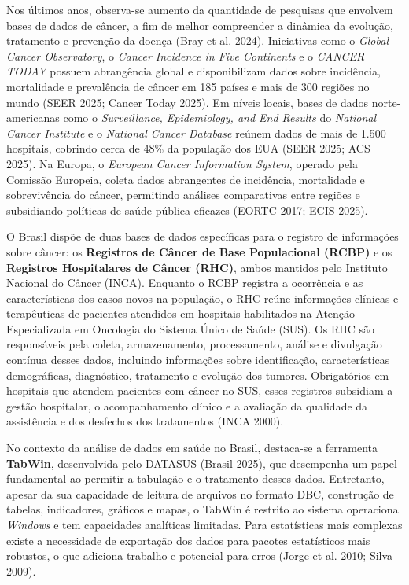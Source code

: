 \documentclass[
  brazilian,
  a4paper,
  oneside]{scrbook}
\begin{document}
Nos últimos anos, observa-se aumento da quantidade de pesquisas que
envolvem bases de dados de câncer, a fim de melhor compreender a
dinâmica da evolução, tratamento e prevenção da doença ({Bray et al.}
2024). Iniciativas como o \emph{Global Cancer Observatory}, o
\emph{Cancer Incidence in Five Continents} e o \emph{CANCER TODAY}
possuem abrangência global e disponibilizam dados sobre incidência,
mortalidade e prevalência de câncer em 185 países e mais de 300 regiões
no mundo (SEER 2025; Cancer Today 2025). Em níveis locais, bases de
dados norte-americanas como o \emph{Surveillance, Epidemiology, and End
Results} do \emph{National Cancer Institute} e o \emph{National Cancer
Database} reúnem dados de mais de 1.500 hospitais, cobrindo cerca de
48\% da população dos EUA (SEER 2025; ACS 2025). Na Europa, o
\emph{European Cancer Information System}, operado pela Comissão
Europeia, coleta dados abrangentes de incidência, mortalidade e
sobrevivência do câncer, permitindo análises comparativas entre regiões
e subsidiando políticas de saúde pública eficazes (EORTC 2017; ECIS
2025).

O Brasil dispõe de duas bases de dados específicas para o registro de
informações sobre câncer: os \textbf{Registros de Câncer de Base
Populacional (RCBP)} e os \textbf{Registros Hospitalares de Câncer
(RHC)}, ambos mantidos pelo Instituto Nacional do Câncer (INCA).
Enquanto o RCBP registra a ocorrência e as características dos casos
novos na população, o RHC reúne informações clínicas e terapêuticas de
pacientes atendidos em hospitais habilitados na Atenção Especializada em
Oncologia do Sistema Único de Saúde (SUS). Os RHC são responsáveis pela
coleta, armazenamento, processamento, análise e divulgação contínua
desses dados, incluindo informações sobre identificação, características
demográficas, diagnóstico, tratamento e evolução dos tumores.
Obrigatórios em hospitais que atendem pacientes com câncer no SUS, esses
registros subsidiam a gestão hospitalar, o acompanhamento clínico e a
avaliação da qualidade da assistência e dos desfechos dos tratamentos
(INCA 2000).

No contexto da análise de dados em saúde no Brasil, destaca-se a
ferramenta \textbf{TabWin}, desenvolvida pelo DATASUS (Brasil 2025), que
desempenha um papel fundamental ao permitir a tabulação e o tratamento
desses dados. Entretanto, apesar da sua capacidade de leitura de
arquivos no formato DBC, construção de tabelas, indicadores, gráficos e
mapas, o TabWin é restrito ao sistema operacional \emph{Windows} e tem
capacidades analíticas limitadas. Para estatísticas mais complexas
existe a necessidade de exportação dos dados para pacotes estatísticos
mais robustos, o que adiciona trabalho e potencial para erros (Jorge et
al. 2010; Silva 2009).
\end{document}
